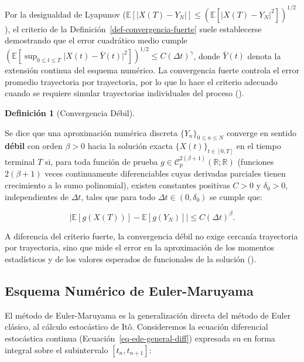 \documentclass[
  spanish,
  letterpaper,
  DIV=11,
  numbers=noendperiod]{scrreprt}
\theoremstyle{plain}
\theoremstyle{plain}
\theoremstyle{plain}
\theoremstyle{definition}
\newtheorem{definition}{Definición}[chapter]
\theoremstyle{remark}
\begin{document}
Por la desigualdad de Lyapunov
(\(\mathbb{E}[\vert X(T) - Y_N \vert] \le (\mathbb{E}[\vert X(T) - Y_N \vert^2])^{1/2}\)),
el criterio de la Definición~\ref{def-convergencia-fuerte} suele
establecerse demostrando que el error cuadrático medio cumple
\(\displaystyle \left(\mathbb{E}\left[\sup_{0 \le t \le T} \vert X(t) - \bar{Y}(t) \vert^2\right]\right)^{1/2} \le C(\Delta t)^\gamma\),
donde \(\bar{Y}(t)\) denota la extensión continua del esquema numérico.
La convergencia fuerte controla el error promedio trayectoria por
trayectoria, por lo que lo hace el criterio adecuado cuando se requiere
simular trayectorias individuales del proceso
().

\begin{definition}[Convergencia
Débil]\protect\hypertarget{def-convergencia-debil}{}\label{def-convergencia-debil}

Se dice que una aproximación numérica discreta
\(\{Y_n\}_{0 \le n \le N}\) converge en sentido \textbf{débil} con orden
\(\beta > 0\) hacia la solución exacta \(\{X(t)\}_{t \in [0, T]}\) en el
tiempo terminal \(T\) si, para toda función de prueba
\(g \in \mathcal{C}_p^{2(\beta+1)}(\mathbb{R}; \mathbb{R})\) (funciones
\(2(\beta+1)\) veces continuamente diferenciables cuyas derivadas
parciales tienen crecimiento a lo sumo polinomial), existen constantes
positivas \(C > 0\) y \(\delta_0 > 0\), independientes de \(\Delta t\),
tales que para todo \(\Delta t \in (0, \delta_0)\) se cumple que:

\[
\left\vert \mathbb{E}[g(X(T))] - \mathbb{E}[g(Y_N)] \right\vert \le C (\Delta t)^\beta.
\]

\end{definition}

A diferencia del criterio fuerte, la convergencia débil no exige
cercanía trayectoria por trayectoria, sino que mide el error en la
aproximación de los momentos estadísticos y de los valores esperados de
funcionales de la solución ().

\subsection{Esquema Numérico de
Euler-Maruyama}\label{sec-euler-maruyama}

El método de Euler-Maruyama es la generalización directa del método de
Euler clásico, al cálculo estocástico de Itô. Consideremos la ecuación
diferencial estocástica continua (Ecuación~\ref{eq-ede-general-diff})
expresada su en forma integral sobre el subintervalo \([t_n, t_{n+1}]:\)
\end{document}
